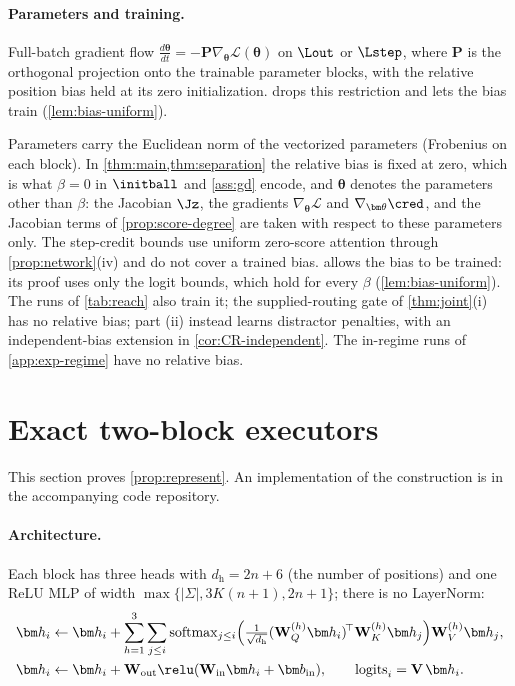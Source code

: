 \paragraph{Parameters and training.}

\begin{assumption}[Training]
\label{ass:gd}
Full-batch gradient flow $\tfrac{d\bm\theta}{dt}=-\mathbf P\nabla_{\bm\theta}\mathcal L(\bm\theta)$ on $\Lout$ or $\Lstep$, where $\mathbf P$ is the orthogonal projection onto
the trainable parameter blocks, with the relative
position bias held at its zero initialization.  drops this restriction and lets the bias train (\cref{lem:bias-uniform}).
\end{assumption}

\label{rem:norms}Parameters carry the Euclidean norm of the vectorized parameters (Frobenius on
each block). In \cref{thm:main,thm:separation} the relative bias is fixed at zero, which is what $\beta=0$ in $\initball$ and
\cref{ass:gd} encode, and $\bm\theta$ denotes the parameters other than $\beta$: the Jacobian $\Jz$, the gradients $\nabla_{\bm\theta}\mathcal L$ and
$\nabla_{\bm\theta}\cred$, and the Jacobian terms of \cref{prop:score-degree} are taken with respect to these parameters only. The step-credit bounds use uniform
zero-score attention through \cref{prop:network}(iv) and do not cover a trained bias.  allows the bias to be
trained: its proof uses only the logit bounds, which hold for every $\beta$ (\cref{lem:bias-uniform}). The runs of \cref{tab:reach} also train it; the supplied-routing gate of \cref{thm:joint}(i) has no relative bias; part (ii) instead learns distractor penalties, with an independent-bias extension in \cref{cor:CR-independent}. The in-regime runs of \cref{app:exp-regime} have no relative bias.


\section{Exact two-block executors}
\label{app:architectures}

This section proves \cref{prop:represent}. An implementation of the construction is in the accompanying code repository.

\paragraph{Architecture.}
\label{app:construction}
\label{app:model}
Each block has three heads with $d_{\mathrm h}=2n+6$ (the number of positions) and one ReLU MLP of width $\max\{|\Sigma|,3K(n+1),2n+1\}$;
there is no LayerNorm:
\begin{align*}
 \bm h_i&\leftarrow \bm h_i+\sum_{h=1}^{3}\sum_{j\le i}\operatorname{softmax}_{j\le i}\Bigl(\tfrac{1}{\sqrt{d_{\mathrm h}}}(\mathbf W^{(h)}_Q\bm h_i)^{\!\top}\mathbf W^{(h)}_K\bm h_j\Bigr)\mathbf W^{(h)}_V\bm h_j,\\
 \bm h_i&\leftarrow \bm h_i+\mathbf W_{\mathrm{out}}\relu(\mathbf W_{\mathrm{in}}\bm h_i+\bm b_{\mathrm{in}}),\qquad \mathrm{logits}_i=\mathbf V\,\bm h_i .
\end{align*}

